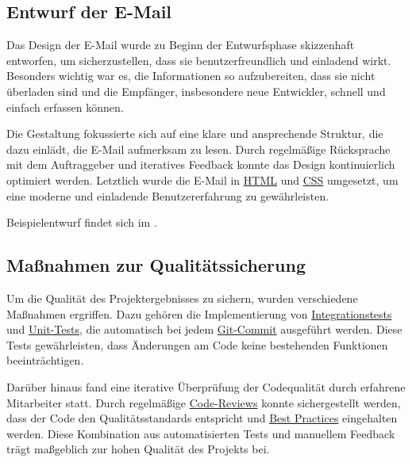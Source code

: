 \subsection{Entwurf der E-Mail}
\label{sec:Benutzeroberflaeche}

Das Design der E-Mail wurde zu Beginn der Entwurfsphase skizzenhaft entworfen, um sicherzustellen, dass sie benutzerfreundlich und einladend wirkt. Besonders wichtig war es, die Informationen so aufzubereiten, dass sie nicht überladen sind und die Empfänger, insbesondere neue Entwickler, schnell und einfach erfassen können. 

Die Gestaltung fokussierte sich auf eine klare und ansprechende Struktur, die dazu einlädt, die E-Mail aufmerksam zu lesen. Durch regelmäßige Rücksprache mit dem Auftraggeber und iteratives Feedback konnte das Design kontinuierlich optimiert werden. Letztlich wurde die E-Mail in \hyperlink{HTML}{\textcolor{AOBlau}{HTML}} und \hyperlink{CSS}{\textcolor{AOBlau}{CSS}} umgesetzt, um eine moderne und einladende Benutzererfahrung zu gewährleisten.

Beispielentwurf findet sich im .

\subsection{Maßnahmen zur Qualitätssicherung}
\label{sec:Qualitaetssicherung}

Um die Qualität des Projektergebnisses zu sichern, wurden verschiedene Maßnahmen ergriffen. Dazu gehören die Implementierung von \hyperlink{IntegrationTests}{\textcolor{AOBlau}{Integrationstests}} und \hyperlink{UnitTests}{\textcolor{AOBlau}{Unit-Tests}}, die automatisch bei jedem \hyperlink{GitLab}{\textcolor{AOBlau}{Git-Commit}} ausgeführt werden. Diese Tests gewährleisten, dass Änderungen am Code keine bestehenden Funktionen beeinträchtigen.

Darüber hinaus fand eine iterative Überprüfung der Codequalität durch erfahrene Mitarbeiter statt. Durch regelmäßige \hyperlink{CodeReview}{\textcolor{AOBlau}{Code-Reviews}} konnte sichergestellt werden, dass der Code den Qualitätsstandards entspricht und \hyperlink{BestPractices}{\textcolor{AOBlau}{Best Practices}} eingehalten werden. Diese Kombination aus automatisierten Tests und manuellem Feedback trägt maßgeblich zur hohen Qualität des Projekts bei.
